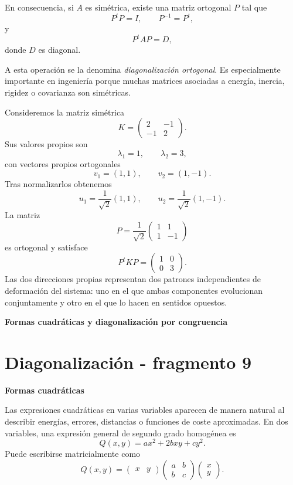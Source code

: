 En consecuencia, si $A$ es simétrica, existe una matriz ortogonal $P$ tal que
\[
P^tP=I,
\qquad
P^{-1}=P^t,
\]
y
\[
\boxed{P^tAP=D,}
\]
donde $D$ es diagonal.

A esta operación se la denomina \emph{diagonalización ortogonal}. Es especialmente importante en ingeniería porque muchas matrices asociadas a energía, inercia, rigidez o covarianza son simétricas.

\begin{example}
Consideremos la matriz simétrica
\[
K=\begin{pmatrix}
2&-1\\
-1&2
\end{pmatrix}.
\]
Sus valores propios son
\[
\lambda_1=1,
\qquad
\lambda_2=3,
\]
con vectores propios ortogonales
\[
v_1=(1,1),
\qquad
v_2=(1,-1).
\]
Tras normalizarlos obtenemos
\[
u_1=\frac1{\sqrt2}(1,1),
\qquad
u_2=\frac1{\sqrt2}(1,-1).
\]
La matriz
\[
P=\frac1{\sqrt2}
\begin{pmatrix}
1&1\\
1&-1
\end{pmatrix}
\]
es ortogonal y satisface
\[
P^tKP=\begin{pmatrix}1&0\\0&3\end{pmatrix}.
\]
Las dos direcciones propias representan dos patrones independientes de deformación del sistema: uno en el que ambas componentes evolucionan conjuntamente y otro en el que lo hacen en sentidos opuestos.
\end{example}

\textbf{Formas cuadráticas y diagonalización por congruencia}


\section{Diagonalización - fragmento 9}
\textbf{Formas cuadráticas}

Las expresiones cuadráticas en varias variables aparecen de manera natural al describir energías, errores, distancias o funciones de coste aproximadas. En dos variables, una expresión general de segundo grado homogénea es
\[
Q(x,y)=ax^2+2bxy+cy^2.
\]
Puede escribirse matricialmente como
\[
Q(x,y)=
\begin{pmatrix}x&y\end{pmatrix}
\begin{pmatrix}a&b\\b&c\end{pmatrix}
\begin{pmatrix}x\\y\end{pmatrix}.
\]

